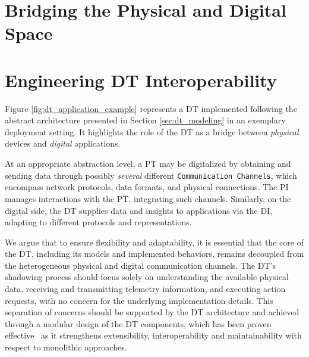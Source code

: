 \section{Bridging the Physical and Digital Space}



\section{Engineering \acl{DT} Interoperability}
\label{sec:engineering-interoperability}

Figure \ref{fig:dt_application_example} represents a \ac{DT} implemented following the abstract architecture presented in Section \ref{sec:dt_modeling} in an exemplary deployment setting.
It highlights the role of the \ac{DT} as a bridge between \emph{physical} devices and \emph{digital} applications.

At an appropriate abstraction level, a \ac{PT} may be digitalized by obtaining and sending data through possibly \emph{several} different \texttt{Communication Channels}, which 
encompass network protocols, data formats, and physical connections.
The \ac{PI} manages interactions with the \ac{PT}, integrating such channels.
%
Similarly, on the digital side, the \ac{DT} supplies data and insights to applications via the \ac{DI}, adapting to different protocols and representations.

%
We argue that to ensure flexibility and adaptability, it is essential that the core of the \ac{DT}, including its models and implemented behaviors, remains decoupled from the heterogeneous physical and digital communication channels.%
%
The \ac{DT}'s shadowing process should focus solely on understanding the available physical data, receiving and transmitting telemetry information, and executing action requests, with no concern for the underlying implementation details.
%
This separation of concerns should be supported by the \ac{DT} architecture and achieved through a modular design of the \ac{DT} components, which has been proven effective~\cite{requirements-patterns-dt-industry-bellavista-2023,bellavista2024fgcs} as it strengthens extensibility, interoperability and maintainability with respect to monolithic approaches.


